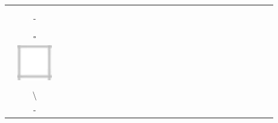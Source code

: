 \documentclass[10pt]{article}
\begin{document}
\begin{center}
\begin{tabular}{|c|c|c|c|c|c|c|c|c|c|c|c|c|c|c|c|c|c|c|c|c|c|c|c|c|c|c|c|}
\hline
 &  &  &  &  &  &  &  &  &  &  &  &  &  &  &  &  &  &  &  &  &  &  &  &  &  &  &  \\
\hline
 &  &  &  &  &  &  &  &  &  &  &  &  &  &  &  &  &  &  &  &  &  &  &  &  &  &  &  \\
\hline
 &  &  &  &  &  &  &  &  &  &  &  &  &  &  &  &  &  &  &  &  &  &  &  &  &  &  &  \\
\hline
 & - &  &  &  &  &  &  &  &  &  &  &  &  &  &  &  &  &  &  &  &  &  &  &  &  &  &  \\
\hline
 &  &  &  &  &  &  &  &  &  &  &  &  &  &  &  &  &  &  &  &  &  &  &  &  &  &  &  \\
\hline
 & \(\square\) &  &  &  &  &  &  &  &  &  &  &  &  &  &  &  &  &  &  &  &  &  &  &  &  &  &  \\
\hline
 & \includegraphics[max width=\textwidth]{2024_11_21_49bfa1d51da2e7fce9c5g-04}
 &  &  &  &  &  &  &  &  &  &  &  &  &  &  &  &  &  &  &  &  &  &  &  &  &  &  \\
\hline
 &  &  &  &  &  &  &  &  &  &  &  &  &  &  &  &  &  &  &  &  &  &  &  &  &  &  &  \\
\hline
 & \textbackslash  &  &  &  &  &  &  &  &  &  &  &  &  &  &  &  &  &  &  &  &  &  &  &  &  &  &  \\
\hline
 & - &  &  &  &  &  &  &  &  &  &  &  &  &  &  &  &  &  &  &  &  &  &  &  &  &  &  \\

\end{tabular}
\end{center}
\end{document}
